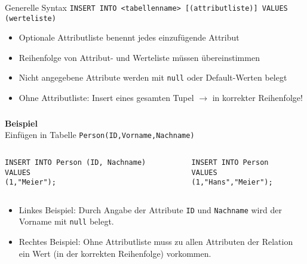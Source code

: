\begin{frame}[fragile]\frametitle{\insertsection}
	\framesubtitle{\insertsubsection}
\onslide
	\begin{block}{Generelle Syntax}
	\texttt{INSERT INTO <tabellenname> [(attributliste)] VALUES (werteliste)}
	\end{block}
\pause
	\begin{itemize}
		\item Optionale Attributliste benennt jedes einzuf\"ugende Attribut 
		\item Reihenfolge von Attribut- und Werteliste müssen übereinstimmen
		\item Nicht angegebene Attribute werden mit \texttt{null} oder Default-Werten belegt
		\item Ohne Attributliste: Insert eines gesamten Tupel $\rightarrow$ in korrekter Reihenfolge!
	\end{itemize}
\end{frame}

\begin{frame}[fragile]\frametitle{\insertsection}
	\framesubtitle{\insertsubsection}
	\textbf{Beispiel}\\[4pt]
  Einf\"ugen in Tabelle \texttt{Person(ID,Vorname,Nachname)}
	\begin{columns}
		\begin{column}{.48\textwidth}
		\begin{lstlisting}[xleftmargin=2ex]
INSERT INTO Person (ID, Nachname)
VALUES
(1,"Meier");
		\end{lstlisting}
		\end{column}

		\begin{column}{.48\textwidth}
		\begin{lstlisting}[xleftmargin=3ex]
INSERT INTO Person
VALUES
(1,"Hans","Meier");
		\end{lstlisting}
		\end{column}
	\end{columns}
\abs
\begin{itemize}
	\item Linkes Beispiel: Durch Angabe der Attribute \texttt{ID} und \texttt{Nachname} 
		wird der Vorname mit \texttt{null} belegt. 
	\item Rechtes Beispiel: Ohne Attributliste muss zu allen Attributen der Relation ein Wert
	(in der korrekten Reihenfolge) vorkommen.	
\end{itemize}
\end{frame}

